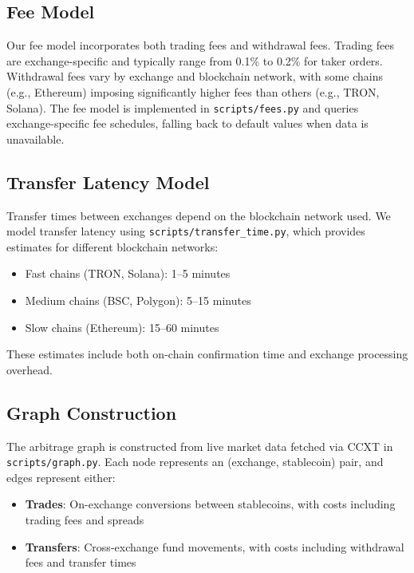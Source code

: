 \documentclass[11pt]{article}
\begin{document}
\subsection{Fee Model}

Our fee model incorporates both trading fees and withdrawal fees. Trading fees are exchange-specific and typically range from 0.1\% to 0.2\% for taker orders. Withdrawal fees vary by exchange and blockchain network, with some chains (e.g., Ethereum) imposing significantly higher fees than others (e.g., TRON, Solana). The fee model is implemented in \texttt{scripts/fees.py} and queries exchange-specific fee schedules, falling back to default values when data is unavailable.

\subsection{Transfer Latency Model}

Transfer times between exchanges depend on the blockchain network used. We model transfer latency using \texttt{scripts/transfer\_time.py}, which provides estimates for different blockchain networks:
\begin{itemize}
\item Fast chains (TRON, Solana): 1--5 minutes
\item Medium chains (BSC, Polygon): 5--15 minutes  
\item Slow chains (Ethereum): 15--60 minutes
\end{itemize}

These estimates include both on-chain confirmation time and exchange processing overhead.

\subsection{Graph Construction}

The arbitrage graph is constructed from live market data fetched via CCXT in \texttt{scripts/graph.py}. Each node represents an (exchange, stablecoin) pair, and edges represent either:
\begin{itemize}
\item \textbf{Trades}: On-exchange conversions between stablecoins, with costs including trading fees and spreads
\item \textbf{Transfers}: Cross-exchange fund movements, with costs including withdrawal fees and transfer times
\end{itemize}
\end{document}

